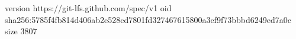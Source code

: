 version https://git-lfs.github.com/spec/v1
oid sha256:5785f4fb814d406ab2e528cd7801fd327467615800a3ef9f73bbbd6249ed7a0c
size 3807
